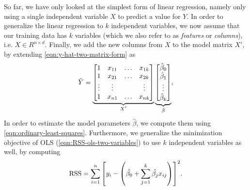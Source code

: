 So far, we have only looked at the simplest form of linear regression, namely only using a single independent variable $X$ to predict a value for $Y$. In order to generalize the linear regression to $k$ independent variables, we now assume that our training data has $k$ variables (which we also refer to as \textit{features} or \textit{columns}), i.e. $X \in R^{n \times d}$. Finally, we add the new columns from $X$ to the model matrix $X'$, by extending \cref{eqn:y-hat-two-matrix-form} as
\begin{align}
    \hat{Y} =
        \undertext{
        \begin{bmatrix}
            1 & x_{11} & \ldots & x_{1k} \\
            1 & x_{21} & \ldots & x_{2k} \\
            \vdots & \vdots & & \vdots \\
            1 & x_{n1} & \ldots & x_{nk} \\
        \end{bmatrix}
        }{$X'$}
        \undertext{
        \begin{bmatrix}
            \hat{\beta}_0 \\
            \hat{\beta}_1 \\
            \vdots \\
            \hat{\beta}_k \\
        \end{bmatrix}
        }{$\hat{\beta}$},
    \label{eqn:y-hat-matrix-form-general}
\end{align}
In order to estimate the model parameters $\hat{\beta}$, we compute them using \cref{eqn:ordinary-least-squares}. Furthermore, we generalize the minimization objective of OLS (\cref{eqn:RSS-ols-two-variables}) to use $k$ independent variables as well, by computing
\begin{align}
    \text{RSS} = \sum\limits_{i=1}^{n}{\left[y_i - \left(\hat{\beta_0} +  \sum\limits_{j=1}^{k}{\hat{\beta_j}x_{ij}}\right)\right]^2}.
    \label{eqn:RSS-ols-k-variables}
\end{align}

